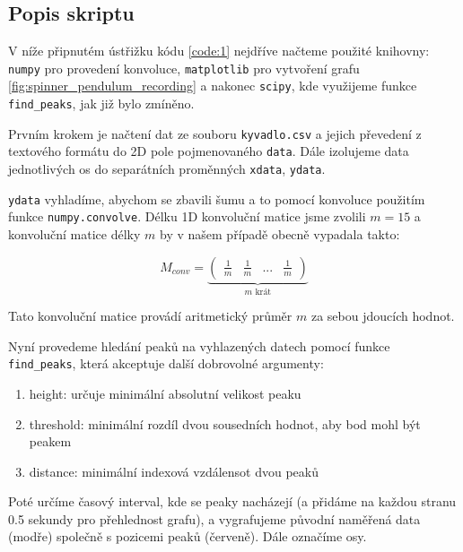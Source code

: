 \subsection{Popis skriptu}

V níže připnutém ústřižku kódu \ref{code:1} nejdříve načteme použité knihovny:
\texttt{numpy} \cite{numpy} pro provedení konvoluce,
\texttt{matplotlib} pro vytvoření grafu \ref{fig:spinner_pendulum_recording} \cite{matplotlib} a nakonec
\texttt{scipy}, kde využijeme funkce \texttt{find\_peaks}, jak již bylo zmíněno.

Prvním krokem je načtení dat ze souboru \texttt{kyvadlo.csv} a jejich převedení z textového formátu do 2D pole pojmenovaného \texttt{data}.
Dále izolujeme data jednotlivých os do separátních proměnných \texttt{xdata}, \texttt{ydata}.

\texttt{ydata} vyhladíme, abychom se zbavili šumu a to pomocí konvoluce použitím funkce \texttt{numpy.convolve}.
Délku 1D konvoluční matice jsme zvolili $m = 15$ a konvoluční matice délky $m$ by v našem případě obecně vypadala takto:

\begin{equation}
    \label{eq:conv_matrix_avg}
    M_{conv} =
    \underbrace{
        \begin{pmatrix}
            \frac{1}{m} & \frac{1}{m} & ... & \frac{1}{m}
        \end{pmatrix}
    }_{m\text{ krát}}
\end{equation}

Tato konvoluční matice provádí aritmetický průměr $m$ za sebou jdoucích hodnot.

Nyní provedeme hledání peaků na vyhlazených datech pomocí funkce \texttt{find\_peaks}, která akceptuje další dobrovolné argumenty:
\begin{enumerate}[topsep=0pt, partopsep=0pt]
    \setlength{\itemsep}{0pt}%
    \setlength{\parskip}{0pt}%
    \item height: určuje minimální absolutní velikost peaku
    \item threshold: minimální rozdíl dvou sousedních hodnot, aby bod mohl být peakem
    \item distance: minimální indexová vzdálensot dvou peaků
\end{enumerate}

Poté určíme časový interval, kde se peaky nacházejí (a přidáme na každou stranu 0.5 sekundy pro přehlednost grafu),
a vygrafujeme původní naměřená data (modře) společně s pozicemi peaků (červeně). Dále označíme osy.


